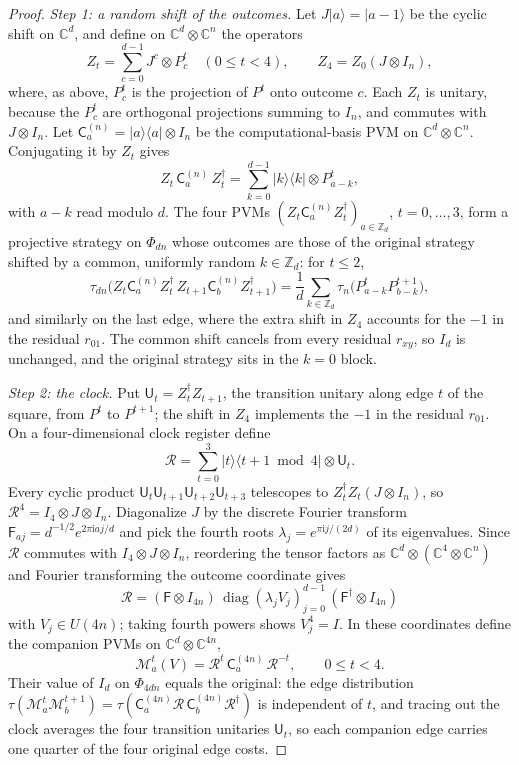\documentclass[aps,prl,reprint,superscriptaddress,longbibliography,floatfix,raggedbottom]{revtex4-2}
\newcommand{\C}{\mathbb C}
\newcommand{\Z}{\mathbb Z}
\newcommand{\ii}{\mathrm i}
\newcommand{\ket}[1]{\lvert #1\rangle}
\newcommand{\bra}[1]{\langle #1\rvert}
\DeclareMathOperator{\diag}{diag}
\newcommand{\tr}{\tau}
\newcommand{\Comp}[1]{\mathsf C^{(#1)}}
\newcommand{\RootP}{\mathcal M}
\begin{document}
\begin{proof}
\emph{Step 1: a random shift of the outcomes.}
Let $J\ket a=\ket{a-1}$ be the cyclic shift on $\C^d$, and define on
$\C^d\otimes\C^n$ the operators
\[
Z_t=\sum_{c=0}^{d-1}J^c\otimes P^t_c\quad(0\le t<4),
\qquad Z_4=Z_0(J\otimes I_n),
\]
where, as above, $P^t_c$ is the projection of $P^t$ onto outcome $c$.
Each $Z_t$ is unitary, because the $P^t_c$ are orthogonal projections
summing to $I_n$, and commutes with $J\otimes I_n$. Let
$\Comp n_a=\ket a\bra a\otimes I_n$ be the computational-basis PVM on
$\C^d\otimes\C^n$. Conjugating it by $Z_t$ gives
\[
Z_t\,\Comp n_a\,Z_t^\dagger
=\sum_{k=0}^{d-1}\ket k\bra k\otimes P^t_{a-k},
\]
with $a-k$ read modulo $d$. The four PVMs
$(Z_t\Comp n_aZ_t^\dagger)_{a\in\Z_d}$, $t=0,\dots,3$, form a
projective strategy on $\Phi_{dn}$ whose outcomes are those of the
original strategy shifted by a common, uniformly random $k\in\Z_d$:
for $t\le2$,
\[
\tr_{dn}\bigl(Z_t\Comp n_aZ_t^\dagger\,Z_{t+1}\Comp n_bZ_{t+1}^\dagger\bigr)
=\frac1d\sum_{k\in\Z_d}\tr_n\bigl(P^t_{a-k}P^{t+1}_{b-k}\bigr),
\]
and similarly on the last edge, where the extra shift in $Z_4$
accounts for the $-1$ in the residual $r_{01}$. The common shift
cancels from every residual $r_{xy}$, so $I_d$ is unchanged, and the
original strategy sits in the $k=0$ block.

\emph{Step 2: the clock.}
Put $\mathsf U_t=Z_t^\dagger Z_{t+1}$, the transition unitary along edge
$t$ of the square, from $P^t$ to $P^{t+1}$; the shift in $Z_4$
implements the $-1$ in the residual $r_{01}$. On a four-dimensional clock register define
\[
\mathcal R=\sum_{t=0}^3\ket t\bra{t+1\bmod4}\otimes\mathsf U_t .
\]
Every cyclic product $\mathsf U_t\mathsf U_{t+1}\mathsf U_{t+2}
\mathsf U_{t+3}$ telescopes to $Z_t^\dagger Z_t(J\otimes I_n)$, so
$\mathcal R^4=I_4\otimes J\otimes I_n$. Diagonalize $J$ by the discrete
Fourier transform $\mathsf F_{aj}=d^{-1/2}e^{2\pi\ii aj/d}$ and pick the
fourth roots $\lambda_j=e^{\pi\ii j/(2d)}$ of its eigenvalues. Since
$\mathcal R$ commutes with $I_4\otimes J\otimes I_n$, reordering the
tensor factors as $\C^d\otimes(\C^4\otimes\C^n)$ and Fourier
transforming the outcome coordinate gives
\begin{equation}\label{eq:blockdiag}
\mathcal R=(\mathsf F\otimes I_{4n})\,
\diag(\lambda_jV_j)_{j=0}^{d-1}\,
(\mathsf F^\dagger\otimes I_{4n})
\end{equation}
with $V_j\in U(4n)$; taking fourth powers shows $V_j^4=I$. In these
coordinates define the companion PVMs on $\C^d\otimes\C^{4n}$,
\begin{equation}\label{eq:rootmeasurements}
\RootP^t_a(V)=\mathcal R^t\,\Comp{4n}_a\,\mathcal R^{-t},
\qquad 0\le t<4 .
\end{equation}
Their value of $I_d$ on $\Phi_{4dn}$ equals the original: the edge
distribution
$\tr(\RootP^t_a\RootP^{t+1}_b)=\tr(\Comp{4n}_a\mathcal R\,
\Comp{4n}_b\mathcal R^\dagger)$ is independent of $t$, and tracing out
the clock averages the four transition unitaries $\mathsf U_t$, so each
companion edge carries one quarter of the four original edge costs.


\end{proof}
\end{document}
